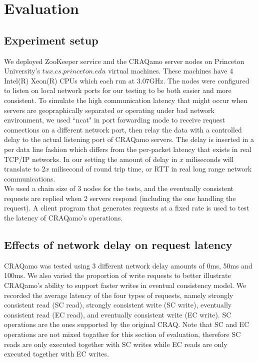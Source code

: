 \section{Evaluation}
\label{sec:eval}

\subsection{Experiment setup}
We deployed ZooKeeper service and the CRAQamo server nodes on Princeton University's $tux.cs.princeton.edu$ virtual machines.
These machines have 4 Intel(R) Xeon(R) CPUs which each run at 3.07GHz. The nodes were configured to listen on local network ports for our testing to be both easier and more consistent. To simulate the high communication latency that might occur when servers are geopraphically separated or operating under bad network environment, we used ``ncat" in port forwarding mode to receive request connections on a different network port, then relay the data with a controlled delay to the actual listening port of CRAQamo servers. The delay is inserted in a per data line fashion which differs from the per-packet latency that exists in real TCP/IP networks. In our setting the amount of delay in $x$ miliseconds will
translate to $2x$ milisecond of round trip time, or RTT in real long range network communications. \\

We used a chain size of 3 nodes for the tests, and the eventually consistent requests are replied when 2 servers respond (including the one handling the request). A client program that generates requests at a fixed rate is used to test the latency of CRAQamo's operations. 


\subsection{Effects of network delay on request latency}
CRAQamo was tested using 3 different network delay amounts of 0ms, 50ms and 100ms. We also varied the proportion of write requests to better illustrate CRAQamo's ability to support faster writes in eventual consistency model. We recorded the average latency of the four types of requests, namely strongly consistent read (SC read), strongly consistent write (SC write), eventually consistent read (EC read), and eventually consistent write (EC write). SC operations are the ones supported by the original CRAQ. Note that SC and EC operations are not mixed togather for this section of evaluation, therefore SC reads are only executed together with SC writes while EC reads are only executed together with EC writes. \\

